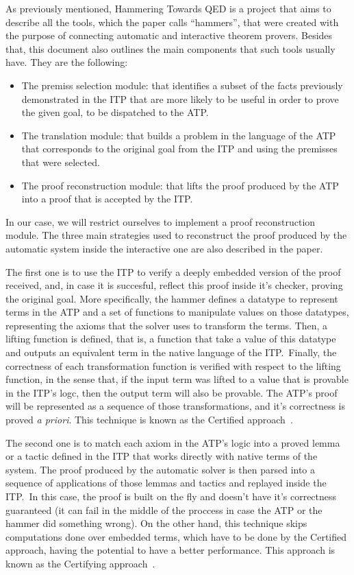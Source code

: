 As previously mentioned, Hammering Towards QED is a project
that aims to describe all the tools, which the paper calls ``hammers'',
that were created with the purpose of connecting automatic and interactive
theorem provers. Besides that, this document also outlines
the main components that such tools usually have. They are
the following:

\begin{itemize}
  \item The premiss selection module: that identifies
        a subset of the facts previously demonstrated in the
        ITP that are more likely to be useful in order to
        prove the given goal, to be dispatched to the ATP.\@
  \item The translation module: that builds a problem in the language of the
        ATP that corresponds to the original goal from the ITP and using
        the premisses that were selected.\@
  \item The proof reconstruction module: that lifts the proof produced
        by the ATP into a proof that is accepted by the ITP.\@
\end{itemize}

In our case, we will restrict ourselves to implement a proof reconstruction module.
The three main strategies used to reconstruct the proof produced
by the automatic system inside the interactive one are also described in the paper.

The first one is to use the ITP to verify a deeply embedded version of the proof
received, and, in case it is succesful, reflect this proof inside it's checker, proving
the original goal. More specifically, the hammer defines a datatype to represent
terms in the ATP and a set of functions to manipulate values on those datatypes, representing
the axioms that the solver uses to transform the terms. Then, a lifting function is defined, that is,
a function that take a value of this datatype and outputs an equivalent term in the native
language of the ITP.\ Finally, the correctness of each transformation function is
verified with respect to the lifting function, in the sense that, if the input term
was lifted to a value that is provable in the ITP's logc, then the output term will
also be provable. The ATP's proof will be represented as a sequence of those
transformations, and it's correctness is proved \textit{a priori}. This technique is known as
the Certified approach\ \cite{snipe}.

The second one is to match each axiom in the ATP's logic into a proved lemma or a tactic
defined in the ITP that works directly with native terms of the system.
The proof produced by the automatic solver is then parsed into a sequence of applications
of those lemmas and tactics and replayed inside the ITP.\ In this case, the proof is built
on the fly and doesn't have it's correctness guaranteed (it can fail in the middle of the
proccess in case the ATP or the hammer did something wrong). On the other hand,
this technique skips computations done over embedded terms, which have to be done by the
Certified approach, having the potential to have a better
performance. This approach is known as the Certifying approach\ \cite{snipe}.

